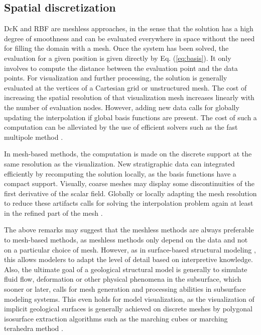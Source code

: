 \documentclass[preprint]{ring20}
\begin{document}
\subsection{Spatial discretization}

DcK and RBF are meshless approaches, in the sense that the solution has a high degree of smoothness and can be evaluated everywhere in space without the need for filling the domain with a mesh. Once the system has been solved, the evaluation for a given position is given directly by Eq. (\ref{eq:basis}). It only involves to compute the distance between the evaluation point and the data points. For visualization and further processing, the solution is generally evaluated at the vertices of a Cartesian grid or unstructured mesh. The cost of increasing the spatial resolution of that visualization mesh increases linearly with the number of evaluation nodes. However, adding new data calls for globally updating the interpolation if global basis functions are present. The cost of such a computation can be alleviated by the use of efficient solvers such as the fast multipole method \citep{greengard_fast_1987}. 

In mesh-based methods, the computation is made on the discrete support at the same resolution as the visualization. New stratigraphic data can integrated efficiently by recomputing the solution locally, as the basis functions have a compact support. Visually, coarse meshes may display some discontinuities of the first derivative of the scalar field. Globally or locally adapting the mesh resolution to reduce these artifacts calls for solving the interpolation problem again at least in the refined part of the mesh \citep{Frank2007CG}. 

The above remarks may suggest that the meshless methods are always preferable to mesh-based methods, as meshless methods only depend on the data and not on a particular choice of mesh. However, as in surface-based structural modeling \citep{Caumon2009MG}, this allows modelers to adapt the level of detail based on interpretive knowledge. Also, the ultimate goal of a geological structural model is generally to simulate fluid flow, deformation or other physical phenomena in the subsurface, which sooner or later, calls for mesh generation and processing abilities in subsurface modeling systems. This even holds for model visualization, as the visualization of implicit geological surfaces is generally achieved on discrete meshes by polygonal isosurface extraction algorithms such as the marching cubes \citep{Calcagno2008PEPI} or marching terahedra method \citep{Frank2007CG}. 
\end{document}
